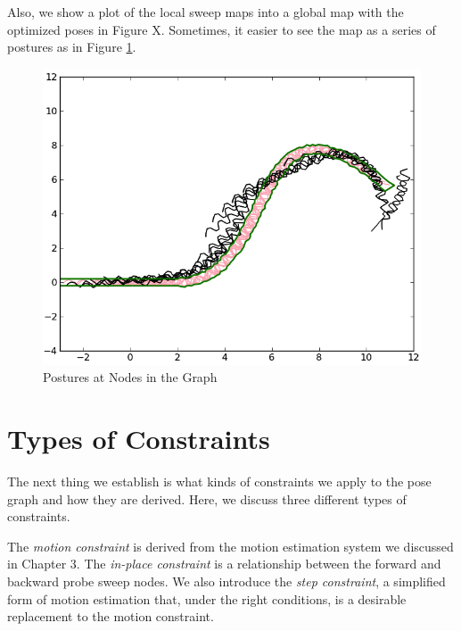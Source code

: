 Also, we show a plot of the local sweep maps into a global map with the optimized poses in Figure X.  Sometimes, it easier to see the map as a series of postures as in Figure \ref{fig:posture_plot}.


\begin{figure}
  \begin{center}
    \includegraphics[scale=0.7]{plotMotionVariableWidth.png}
  \end{center}
  \caption{Postures at Nodes in the Graph}
	\label{fig:posture_plot}
\end{figure}





\section{Types of Constraints}

The next thing we establish is what kinds of constraints we apply to the pose graph and how they are derived.  Here, we discuss three different types of constraints.

The \emph{motion constraint} is derived from the motion estimation system we discussed in Chapter 3.  The \emph{in-place constraint} is a relationship between the forward and backward probe sweep nodes.  We also introduce the \emph{step constraint}, a simplified form of motion estimation that, under the right conditions, is a desirable replacement to the motion constraint.

